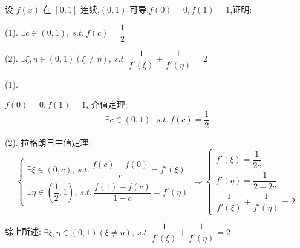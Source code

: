 \begin{proposition}
	设 $f(x)$ 在 $[0,1]$ 连续,$(0,1)$ 可导,$f(0)=0,f(1)=1$,证明:

	(1). $\exists c\in(0,1),\ s.t.\ f(c)=\dfrac{1}{2}$

	(2). $\exists \xi,\eta\in(0,1)(\xi\neq \eta),\ s.t.\ \dfrac{1}{f'(\xi)}+\dfrac{1}{f'(\eta)}=2$
\end{proposition}
\begin{solution}

	(1). 
	
	$f(0)=0,f(1)=1$, 介值定理:
	$$\exists c\in(0,1),\ s.t.\ f(c)=\dfrac{1}{2}$$

	(2). 拉格朗日中值定理:
	$$\begin{cases}
		\exists \xi\in(0,c),\ s.t.\ \dfrac{f(c)-f(0)}{c}=f'(\xi)\\
		\exists \eta\in(\dfrac{1}{2},1),\ s.t.\ \dfrac{f(1)-f(c)}{1-c}=f'(\eta)
	\end{cases}\Rightarrow
	\begin{cases}
		f'(\xi) = \dfrac{1}{2c}\\
		f'(\eta) = \dfrac{1}{2-2c}\\
		\dfrac{1}{f'(\xi)}+\dfrac{1}{f'(\eta)} = 2
	\end{cases}$$

	综上所述: $\exists \xi,\eta\in(0,1)(\xi\neq \eta),\ s.t.\ \dfrac{1}{f'(\xi)}+\dfrac{1}{f'(\eta)}=2$
\end{solution}

